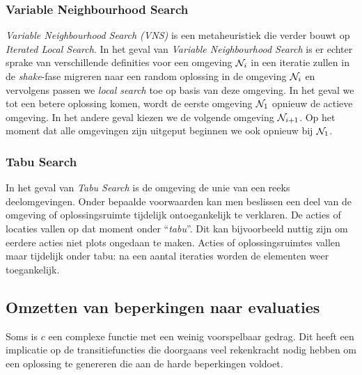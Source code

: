 \subsubsection{Variable Neighbourhood Search}

\emph{Variable Neighbourhood Search (VNS)} is een metaheuristiek die verder bouwt op \emph{Iterated Local Search}. In het geval van \emph{Variable Neighbourhood Search} is er echter sprake van verschillende definities voor een omgeving $\mathcal{N}_i$ in een iteratie zullen in de \emph{shake}-fase migreren naar een random oplossing in de omgeving $\mathcal{N}_i$ en vervolgens passen we \emph{local search} toe op basis van deze omgeving. In het geval we tot een betere oplossing komen, wordt de eerste omgeving $\mathcal{N}_1$ opnieuw de actieve omgeving. In het andere geval kiezen we de volgende omgeving $\mathcal{N}_{i+1}$. Op het moment dat alle omgevingen zijn uitgeput beginnen we ook opnieuw bij $\mathcal{N}_1$.%

\subsubsection{Tabu Search}
In het geval van \emph{Tabu Search} is de omgeving de unie van een reeks deelomgevingen. Onder bepaalde voorwaarden kan men beslissen een deel van de omgeving of oplossingsruimte tijdelijk ontoegankelijk te verklaren. De acties of locaties vallen op dat moment onder ``\emph{tabu}''. Dit kan bijvoorbeeld nuttig zijn om eerdere acties niet plots ongedaan te maken. Acties of oplossingsruimtes vallen maar tijdelijk onder tabu: na een aantal iteraties worden de elementen weer toegankelijk.


\subsection{Omzetten van beperkingen naar evaluaties}

Soms is $c$ een complexe functie met een weinig voorspelbaar gedrag. Dit heeft een implicatie op de transitiefuncties die doorgaans veel rekenkracht nodig hebben om een oplossing te genereren die aan de harde beperkingen voldoet.

